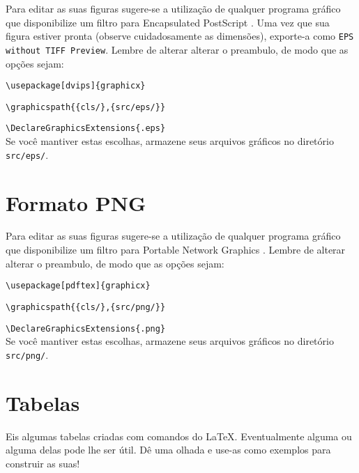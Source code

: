 Para editar as suas figuras sugere-se a utilização de qualquer
programa gráfico que disponibilize um filtro para Encapsulated PostScript
\cite{Doron92e}. Uma vez que sua figura estiver pronta (observe cuidadosamente as dimensões), exporte-a como \texttt{EPS without TIFF Preview}. Lembre de alterar alterar o preambulo, de modo que as opções sejam:

\noindent\verb|\usepackage[dvips]{graphicx}|

\noindent\verb|\graphicspath{{cls/},{src/eps/}}|

\noindent\verb|\DeclareGraphicsExtensions{.eps}|\\
Se você mantiver estas escolhas, armazene seus arquivos gráficos no diretório \texttt{src/eps/}.

\section{Formato PNG}
Para editar as suas figuras sugere-se a utilização de qualquer
programa gráfico que disponibilize um filtro para Portable Network Graphics
\cite{Christensson}. Lembre de alterar alterar o preambulo, de modo que as opções sejam:

\noindent\verb|\usepackage[pdftex]{graphicx}|

\noindent\verb|\graphicspath{{cls/},{src/png/}}|

\noindent\verb|\DeclareGraphicsExtensions{.png}|\\
Se você mantiver estas escolhas, armazene seus arquivos gráficos no diretório \texttt{src/png/}.

\section{Tabelas}

Eis algumas tabelas criadas com comandos do \LaTeX . Eventualmente alguma ou
alguma delas pode lhe ser útil. Dê uma olhada e use-as como exemplos para
construir as suas!

